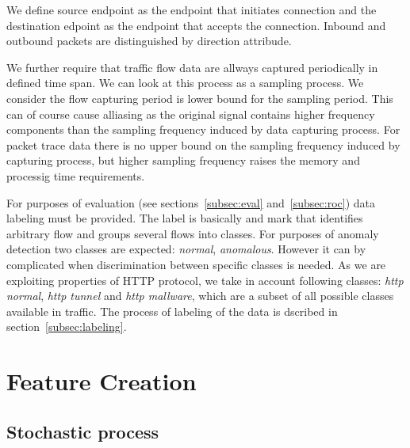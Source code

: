 We define source endpoint as the endpoint that initiates connection and the destination edpoint 
as the endpoint that  accepts the connection. %
Inbound and outbound packets are distinguished
by direction attribude. 

We further require that traffic flow data are allways captured periodically in defined time span.
We can look at this process as a sampling process. We consider the flow capturing period
is lower bound for the sampling period. This can of course cause alliasing as the original
signal contains higher frequency components than the sampling frequency induced by data capturing 
process. For packet trace data there is no upper bound on the sampling frequency induced by 
capturing process, but higher sampling frequency raises the memory and processig time requirements.

For purposes of evaluation (see sections~\ref{subsec:eval} and~\ref{subsec:roc}) data labeling 
must be provided.
The label is basically and mark that identifies arbitrary flow and groups  several flows into
classes. For purposes of anomaly detection two classes are expected: \emph{normal}, \emph{anomalous}.
However it can by complicated when discrimination between specific classes is needed.
As we are exploiting properties of HTTP protocol, we take in account following classes: 
\emph{http normal}, \emph{http tunnel} and \emph{http mallware}, which are a subset of all possible 
classes available in traffic.
The process of labeling of the data is dscribed in section~\ref{subsec:labeling}.

\section{Feature Creation}

\subsection{Stochastic process}

